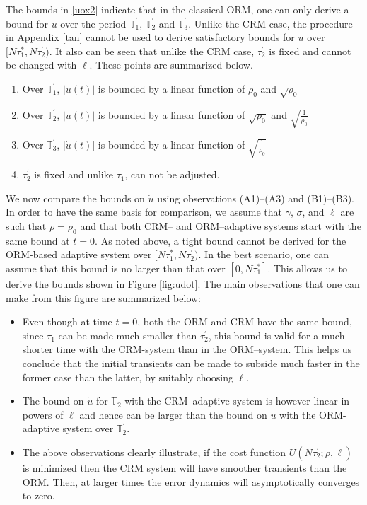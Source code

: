 \documentclass[10pt,journal]{IEEEtran}
\theoremstyle{plain}%
\theoremstyle{definition}
\newcommand{\abs}[1]{\left\lvert#1\right\rvert}
\begin{document}
The bounds in \eqref{uox2} indicate that in the classical ORM, one can only derive a bound for $\dot u$ over the period $\mathbb T_1^\prime$, $\mathbb T_2^\prime$ and $\mathbb T_3^\prime$. Unlike the CRM case, the procedure in Appendix \ref{tan} cannot be used to derive satisfactory bounds for $\dot u$ over $[N\tau_1^*,N\tau_2^\prime)$. It also can be seen that unlike the CRM case, $\tau_2^\prime$ is fixed and cannot be changed with $\ell$. These points are summarized below. \begin{enumerate}[(\bf{B}1)]
\item Over $\mathbb T_1^\prime$, $\abs{\dot u(t)}$ is bounded by a linear function of $\rho_0$ and $\sqrt{\rho_0}$
\item Over $\mathbb T_2^\prime$, $\abs{\dot u (t)}$ is bounded by a linear function of $\sqrt {\rho_0}$ and $\sqrt {\frac{1}{\rho_0}}$
\item Over $\mathbb T_3^\prime$, $\abs{\dot u (t)}$ is bounded by a linear function of $\sqrt {\frac{1}{\rho_0}}$
\item $\tau_2^\prime$ is fixed and unlike $\tau_1$, can not be adjusted.
\end{enumerate}

We now compare the bounds on $\dot u$ using observations (A1)--(A3) and (B1)--(B3). In order to have the same basis for comparison, we assume that $\gamma$, $\sigma$, and $\ell$ are such that $\rho=\rho_0$ and that both CRM-- and ORM--adaptive systems start with the same bound at $t=0$. As noted above, a tight bound cannot be derived for the ORM-based adaptive system over $[N\tau_1^*,N\tau_2^\prime)$.  In the best scenario, one can assume that this bound is no larger than that over $[0,N\tau_1^*]$. This allows us to derive the bounds shown in Figure \ref{fig:udot}. The main observations that one can make from this figure are summarized below:
\begin{itemize}
\item  Even though at time $t = 0$, both the ORM and CRM have the same bound, since $\tau_1$ can be made much smaller than $\tau_2^\prime$, this bound is valid for a much shorter time with the CRM-system than in the ORM--system. This helps us conclude that the initial transients can be made to subside much faster in the former case than the latter, by suitably choosing $\ell$. 
\item The bound on $\dot u$ for $\mathbb T_2$ with the CRM--adaptive system is however linear in powers of $\ell$ and hence can be larger than the bound on $\dot u$ with the ORM-adaptive system over $\mathbb T_2^\prime$. 
\item The above observations clearly illustrate, if the cost function $U(N\tau_2^\prime;\rho,\ell)$ is minimized then the CRM system will have smoother transients than the ORM. Then, at larger times the error dynamics will asymptotically converges to zero.
\end{itemize}
\end{document}
